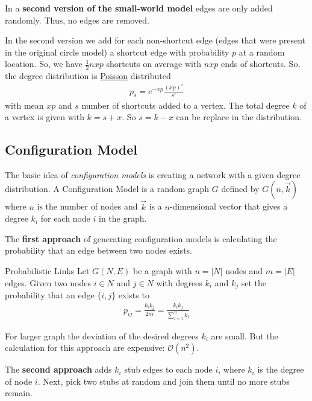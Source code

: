 \documentclass[english]{panikzettel}
\begin{document}
In a \textbf{second version of the small-world model} edges are only added randomly. Thus, no edges are removed.

In the second version we add for each non-shortcut edge (edges that were present in the original circle model) a shortcut edge with probability $ p $ at a random location.
So, we have $ \frac{1}{2} nxp $ shortcuts on average with $ nxp $ ends of shortcuts. So, the degree distribution is \hyperref[sec:poisson_dist]{Poisson} distributed
\begin{align*}
	p_s = e^{-xp}\frac{(xp)^s}{s!}
\end{align*}
with mean $ xp $ and $ s $ number of shortcuts added to a vertex. The total degree $ k $ of a vertex is given with $ k = s + x $. So $ s = k - x $ can be replace in the distribution.

\subsection{Configuration Model}
The basic idea of \emph{configuration models} is creating a network with a given degree distribution.
A Configuration Model is a random graph $ G $ defined by $ G(n,\vec{k}) $ where $ n $ is the number of nodes and $ \vec{k} $ is a $ n $-dimensional vector that gives a degree $ k_i $ for each node $ i $ in the graph.

The \textbf{first approach} of generating configuration models is calculating the probability that an edge between two nodes exists.

\begin{defi}{Probabilistic Links}
	Let $ G(N,E) $ be a graph with $ n = |N| $ nodes and $ m = |E| $ edges.
	Given two nodes $ i \in N $ and $ j \in N $ with degrees $ k_i $ and $ k_j $ set the probability that an edge $ \{i,j\} $ exists to
	\begin{align*}
		p_{ij} = \frac{k_i k_j}{2m} = \frac{k_i k_j}{\sum_{l=1}^{n}k_l}
	\end{align*}
\end{defi}

For larger graph the deviation of the desired degrees $ k_i $ are small. But the calculation for this approach are expensive: $ \mathcal{O}(n^2) $.

The \textbf{second approach} adds $k_i$ stub edges to each node $ i $, where $ k_i $ is the degree of node $ i $. Next, pick two stubs at random and join them until no more stubs remain.
\end{document}
